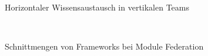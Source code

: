\begin{figure}[hbt!]
	\centering
	\begin{minipage}[t]{0.7\textwidth}	
		\caption{Horizontaler Wissensaustausch in vertikalen Teams}
		\\ %
		\label{fig:VertikaleTeamsWissensaustausch}
	\end{minipage}
\end{figure}

\newpage
\begin{figure}[hbt!]
	\centering
	\begin{minipage}[t]{0.75\textwidth}	
		\caption{Schnittmengen von Frameworks bei Module Federation}
		\\ %
		\label{fig:ModuleFederationSchnittmengenFrameworks}
	\end{minipage}
\end{figure}

